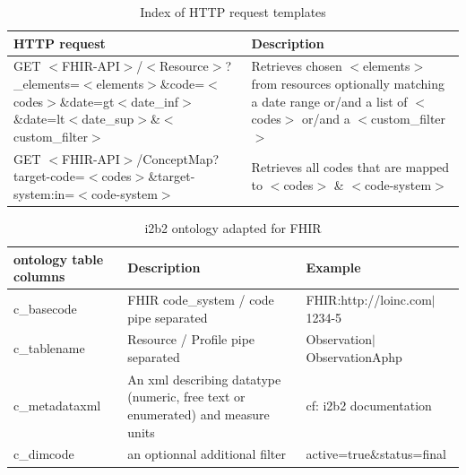 \documentclass{amia}
\begin{document}
\begin{table}[h]
\centering
	\begin{tabular}{|p{6cm}|p{10cm}|}
  \hline
    \textbf{HTTP request}    & \textbf{Description}  \\ \hline
		GET $<$FHIR-API$>$/$<$Resource$>$\newline?\_elements=$<$elements$>$\&code=$<$codes$>$\newline\&date=gt$<$date\_inf$>$\&date=lt$<$date\_sup$>$\newline\&$<$custom\_filter$>$  & Retrieves chosen $<$elements$>$ from resources optionally matching a date range or/and a list of $<$codes$>$  or/and a $<$custom\_filter$>$     \\ \hline
	 GET $<$FHIR-API$>$/ConceptMap\newline?target-code=$<$codes$>$\newline\&target-system:in=$<$code-system$>$  & Retrieves all codes that are mapped to $<$codes$>$ \& $<$code-system$>$   \\ \hline
  \end{tabular}
\caption{Index of HTTP request templates}
	\label{tab2}
\end{table}

\begin{table}[h]
\centering
	\begin{tabular}{|p{2cm}|p{6cm}|p{5cm}|}
  \hline
		\textbf{ontology table columns}    & \textbf{Description} & \textbf{Example} \\ \hline
		c\_basecode  &  FHIR code\_system / code pipe separated  & FHIR:http://loinc.com$|$1234-5  \\ \hline
		c\_tablename &  Resource / Profile pipe separated  & Observation$|$ObservationAphp  \\ \hline
		c\_metadataxml  &  An xml describing datatype (numeric, free text or enumerated) and measure units  & cf: i2b2 documentation   \\ \hline
		c\_dimcode &  an optionnal additional filter  & active=true\&status=final  \\ \hline
  \end{tabular}
\caption{i2b2 ontology adapted for FHIR}
	\label{tab1}
\end{table}
\end{document}
